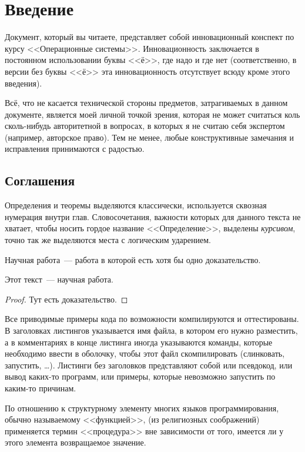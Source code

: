 \chapter*{Введение}
Документ, который вы читаете, представляет собой инновационный конспект по курсу <<Операционные системы>>.
Инновационность заключается в постоянном использовании буквы <<ё>>, где надо и где нет (соответственно, в версии без буквы <<ё>> эта инновационность отсутствует всюду кроме этого введения).

Всё, что не касается технической стороны предметов, затрагиваемых в данном документе, является моей личной точкой зрения, которая не может считаться коль сколь-нибудь авторитетной в вопросах, в которых я не считаю себя экспертом (например, авторское право).
Тем не менее, любые конструктивные замечания и исправления принимаются с радостью.

\section*{Соглашения}
Определения и теоремы выделяются классически, используется сквозная нумерация внутри глав.
Словосочетания, важности которых для данного текста не хватает, чтобы носить гордое название <<Определение>>, выделены \emph{курсивом}, точно так же выделяются места с логическим ударением.

\begin{definition}
Научная работа~--- работа в которой есть хотя бы одно доказательство.
\end{definition}

\begin{theorem}
Этот текст~--- научная работа.
\end{theorem}

\begin{proof}
Тут есть доказательство.
\end{proof}

Все приводимые примеры кода по возможности компилируются и оттестированы.
В заголовках листингов указывается имя файла, в котором его нужно разместить, а в комментариях в конце листинга иногда указываются команды, которые необходимо ввести в оболочку, чтобы этот файл скомпилировать (слинковать, запустить, \dots).
Листинги без заголовков представляют собой или псевдокод, или вывод каких-то программ, или примеры, которые невозможно запустить по каким-то причинам.

По отношению к структурному элементу многих языков программирования, обычно называемому <<функцией>>, (из религиозных соображений) применяется термин <<процедура>> вне зависимости от того, имеется ли у этого элемента возвращаемое значение.

